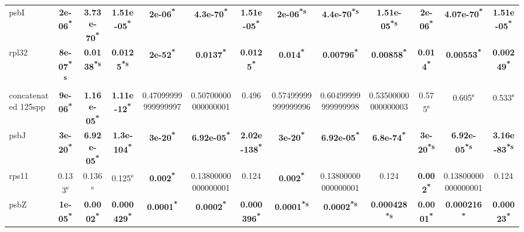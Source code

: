 \documentclass[a4paper]{article}
\begin{document}
\begin{longtable}{l|c|c|c|c|c|c|c|c|c|c|c|c}
psbI&\textbf{2e-06\textsuperscript{*}}&\textbf{3.73e-70\textsuperscript{*}}&\textbf{1.51e-05\textsuperscript{*}}&\textbf{2e-06\textsuperscript{*}}&\textbf{4.3e-70\textsuperscript{*}}&\textbf{1.51e-05\textsuperscript{*}}&\textbf{2e-06\textsuperscript{*}\textsuperscript{s}}&\textbf{4.4e-70\textsuperscript{*}\textsuperscript{s}}&\textbf{1.51e-05\textsuperscript{*}\textsuperscript{s}}&\textbf{2e-06\textsuperscript{*}}&\textbf{4.07e-70\textsuperscript{*}}&\textbf{1.51e-05\textsuperscript{*}}\\
rpl32&\textbf{8e-07\textsuperscript{*}\textsuperscript{s}}&\textbf{0.0138\textsuperscript{*}\textsuperscript{s}}&\textbf{0.0125\textsuperscript{*}\textsuperscript{s}}&\textbf{2e-52\textsuperscript{*}}&\textbf{0.0137\textsuperscript{*}}&\textbf{0.0125\textsuperscript{*}}&\textbf{0.014\textsuperscript{*}}&\textbf{0.00796\textsuperscript{*}}&\textbf{0.00858\textsuperscript{*}}&\textbf{0.014\textsuperscript{*}}&\textbf{0.00553\textsuperscript{*}}&\textbf{0.00249\textsuperscript{*}}\\
concatenated 125spp&\textbf{9e-06\textsuperscript{*}}&\textbf{1.16e-05\textsuperscript{*}}&\textbf{1.11e-12\textsuperscript{*}}&0.47099999999999997&0.50700000000000001&0.496&0.57499999999999996&0.60499999999999998&0.53500000000000003&0.575\textsuperscript{s}&0.605\textsuperscript{s}&0.533\textsuperscript{s}\\
psbJ&\textbf{3e-20\textsuperscript{*}}&\textbf{6.92e-05\textsuperscript{*}}&\textbf{1.3e-104\textsuperscript{*}}&\textbf{3e-20\textsuperscript{*}}&\textbf{6.92e-05\textsuperscript{*}}&\textbf{2.02e-138\textsuperscript{*}}&\textbf{3e-20\textsuperscript{*}}&\textbf{6.92e-05\textsuperscript{*}}&\textbf{6.8e-74\textsuperscript{*}}&\textbf{3e-20\textsuperscript{*}\textsuperscript{s}}&\textbf{6.92e-05\textsuperscript{*}\textsuperscript{s}}&\textbf{3.16e-83\textsuperscript{*}\textsuperscript{s}}\\
rps11&0.133\textsuperscript{s}&0.136\textsuperscript{s}&0.125\textsuperscript{s}&\textbf{0.002\textsuperscript{*}}&0.13800000000000001&0.124&\textbf{0.002\textsuperscript{*}}&0.13800000000000001&0.124&\textbf{0.002\textsuperscript{*}}&0.13800000000000001&0.124\\
psbZ&\textbf{1e-05\textsuperscript{*}}&\textbf{0.0002\textsuperscript{*}}&\textbf{0.000429\textsuperscript{*}}&\textbf{0.0001\textsuperscript{*}}&\textbf{0.0002\textsuperscript{*}}&\textbf{0.000396\textsuperscript{*}}&\textbf{0.0001\textsuperscript{*}\textsuperscript{s}}&\textbf{0.0002\textsuperscript{*}\textsuperscript{s}}&\textbf{0.000428\textsuperscript{*}\textsuperscript{s}}&\textbf{0.0001\textsuperscript{*}}&\textbf{0.000216\textsuperscript{*}}&\textbf{0.00023\textsuperscript{*}}\\

\end{longtable}
\end{document}
